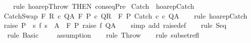 \begin{isabellebody}
%
\isadelimproof
\ \ %
\endisadelimproof
%
\isatagproof
{}\isamarkupfalse%
\ {\isacharparenleft}rule\ hoarep{\isachardot}Throw\ {\isacharbrackleft}THEN\ conseqPre{\isacharbrackright}{\isacharparenright}%
\endisatagproof
{\isafoldproof}%
%
\isadelimproof
\isanewline
%
\endisadelimproof
\isanewline
{}\isamarkupfalse%
\ Catch\ {\isacharequal}\ hoarep{\isachardot}Catch\isanewline
{}\isamarkupfalse%
\ CatchSwap{\isacharcolon}\ {\isachardoublequoteopen}{\isasymlbrakk}{\isasymGamma}{\isacharcomma}{\isasymTheta}{\isasymturnstile}\isactrlbsub {\isacharslash}F\isactrlesub \ R\ c\ Q{\isacharcomma}A{\isacharsemicolon}\ {\isasymGamma}{\isacharcomma}{\isasymTheta}{\isasymturnstile}\isactrlbsub {\isacharslash}F\isactrlesub \ P\ c\ Q{\isacharcomma}R{\isasymrbrakk}\ {\isasymLongrightarrow}\ {\isasymGamma}{\isacharcomma}{\isasymTheta}{\isasymturnstile}\isactrlbsub {\isacharslash}F\isactrlesub \ P\ Catch\ c\ c\ Q{\isacharcomma}A{\isachardoublequoteclose}\isanewline
%
\isadelimproof
\ \ %
\endisadelimproof
%
\isatagproof
{}\isamarkupfalse%
\ {\isacharparenleft}rule\ hoarep{\isachardot}Catch{\isacharparenright}%
\endisatagproof
{\isafoldproof}%
%
\isadelimproof
\isanewline
%
\endisadelimproof
\isanewline
{}\isamarkupfalse%
\ raise{\isacharcolon}\ {\isachardoublequoteopen}P\ {\isasymsubseteq}\ {\isacharbraceleft}s{\isachardot}\ f\ s\ {\isasymin}\ A{\isacharbraceright}\ {\isasymLongrightarrow}\ {\isasymGamma}{\isacharcomma}{\isasymTheta}{\isasymturnstile}\isactrlbsub {\isacharslash}F\isactrlesub \ P\ raise\ f\ Q{\isacharcomma}A{\isachardoublequoteclose}\isanewline
%
\isadelimproof
\ \ %
\endisadelimproof
%
\isatagproof
{}\isamarkupfalse%
\ {\isacharparenleft}simp\ add{\isacharcolon}\ raise{\isacharunderscore}def{\isacharparenright}\isanewline
\ \ \isamarkupfalse%
\ {\isacharparenleft}rule\ Seq{\isacharparenright}\isanewline
\ \ \isamarkupfalse%
\ \ {\isacharparenleft}rule\ Basic{\isacharparenright}\isanewline
\ \ \isamarkupfalse%
\ \ {\isacharparenleft}assumption{\isacharparenright}\isanewline
\ \ \isamarkupfalse%
\ {\isacharparenleft}rule\ Throw{\isacharparenright}\isanewline
\ \ \isamarkupfalse%
\ {\isacharparenleft}rule\ subset{\isacharunderscore}refl{\isacharparenright}\isanewline
\ \ \isamarkupfalse%
%
\endisatagproof
{\isafoldproof}%
%
\isadelimproof
\isanewline
%
\endisadelimproof

\end{isabellebody}
